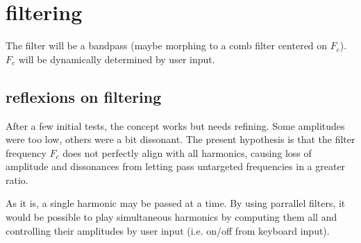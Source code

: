 \documentclass{article}
\begin{document}
\section{filtering}
The filter will be a bandpass (maybe morphing to a comb filter centered on $F_c$).
$F_c$ will be dynamically determined by user input. 

\subsection{reflexions on filtering}
After a few initial tests, the concept works but needs refining. Some amplitudes
were too low, others were a bit dissonant. The present hypothesis is that the
filter frequency $F_c$ does not perfectly align with all harmonics, causing loss
of amplitude and dissonances from letting pass untargeted frequencies in a 
greater ratio. 

As it is, a single harmonic may be passed at a time. By using parrallel filters, 
it would be possible to play simultaneous harmonics by computing them all and
controlling their amplitudes by user input (i.e. on/off from keyboard input).
\end{document}
